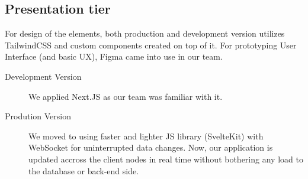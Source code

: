 \subsection{Presentation tier}

For design of the elements, both production and development version utilizes TailwindCSS and custom components created on top of it. For prototyping User Interface (and basic UX), Figma came into use in our team.

\begin{description}
	\item[Development Version] We applied Next.JS as our team was familiar with it.
	\item[Prodution Version] We moved to using faster and lighter JS library (SvelteKit) with WebSocket for uninterrupted data changes. Now, our application is updated accross the client nodes in real time without bothering any load to the database or back-end side.
\end{description}
\clearpage
